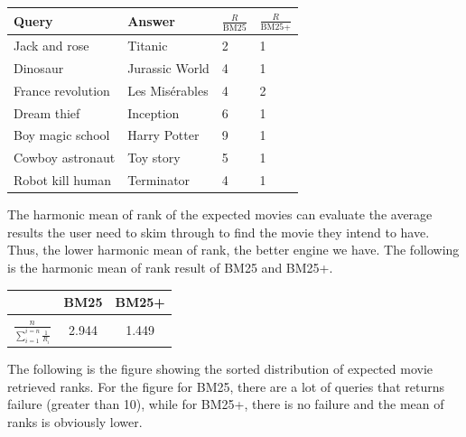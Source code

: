 \documentclass[letterpaper,10pt]{article}
\newenvironment{Figure}
  {\par\medskip\noindent\minipage{\linewidth}}
  {\endminipage\par\medskip}
\begin{document}
\begin{multicols}{2}
    \begin{Figure}
        \centering
        \begin{tabular}{ |l | l |l|l|} \hline
            Query             & Answer         & $\frac{R}{\text{BM25}}$ & $\frac{R}{\text{BM25+}}$ \\ \hline
            Jack and rose     & Titanic        & 2                       & 1                        \\ \hline
            Dinosaur          & Jurassic World & 4                       & 1                        \\ \hline
            France revolution & Les Misérables & 4                       & 2                        \\ \hline
            Dream thief       & Inception      & 6                       & 1                        \\ \hline
            Boy magic school  & Harry Potter   & 9                       & 1                        \\ \hline
            Cowboy astronaut  & Toy story      & 5                       & 1                        \\ \hline
            Robot kill human  & Terminator     & 4                       & 1                        \\ \hline
        \end{tabular}
    \end{Figure}


    The harmonic mean of rank of the expected movies can evaluate the average
    results the user need to skim through to find the movie they intend to have.
    Thus, the lower harmonic mean of rank, the better engine we have.
    The following is the harmonic mean of rank result of BM25 and BM25+.

    \begin{Figure}
        \centering
        \begin{tabular}{ |c | c |c|}
            \hline
                                                           & BM25  & BM25+ \\ \hline
            $\frac{n}{\sum_{i=1}^{i=n} \frac{1}{R_{i}} } $ & 2.944 & 1.449 \\  \hline
        \end{tabular}
    \end{Figure}

    The following is the figure showing the sorted distribution of expected movie retrieved ranks.
    For the figure for BM25, there are a lot of queries that returns failure (greater than 10),
    while for BM25+, there is no failure and the mean of ranks is obviously lower.


\end{multicols}
\end{document}
